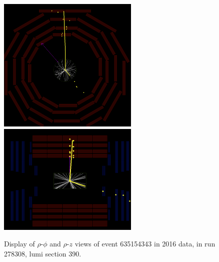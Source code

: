 \begin{figure}[htpb]
  \centering
  \includegraphics[width=0.6\textwidth]{figures/displaced/event-278308_635154343_390_RhoPhi.png}
  \includegraphics[width=0.6\textwidth]{figures/displaced/event-278308_635154343_390_RhoZ.png}
  \caption{Display of $\rho$-$\phi$ and $\rho$-$z$ views of event 635154343 in 2016 data, in run 278308, lumi section 390.}
  \label{fig:dd:event-390}
\end{figure}

